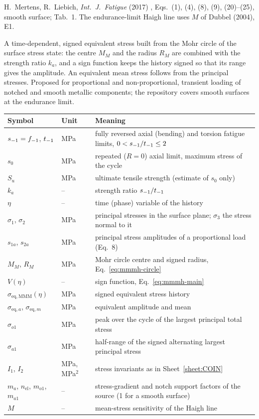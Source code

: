 \label{sheet:MMMH}

 H.~Mertens, R.~Liebich, \emph{Int.\ J.\ Fatigue} (2017) \cite{mertens2017},
Eqs.~(1), (4), (8), (9), (20)--(25), smooth surface; Tab.~1. The endurance-limit Haigh line uses $M$ of
Dubbel (2004), E1.

 A time-dependent, signed equivalent stress built from the Mohr circle of the
surface stress state: the centre $M_M$ and the radius $R_M$ are combined with the strength ratio $k_a$,
and a sign function keeps the history signed so that its range gives the amplitude. An equivalent mean
stress follows from the principal stresses. Proposed for proportional and non-proportional, transient
loading of notched and smooth metallic components; the repository covers smooth surfaces at the
endurance limit.

\begin{center}\small
\begin{tabular}{@{}llp{100mm}@{}}
\toprule
Symbol & Unit & Meaning\\\midrule
$s_{-1}=f_{-1}$, $t_{-1}$ & MPa & fully reversed axial (bending) and torsion fatigue limits, $0<s_{-1}/t_{-1}\le2$\\
$s_0$ & MPa & repeated ($R=0$) axial limit, maximum stress of the cycle\\
$S_u$ & MPa & ultimate tensile strength (estimate of $s_0$ only)\\
$k_a$ & -- & strength ratio $s_{-1}/t_{-1}$\\
$\eta$ & -- & time (phase) variable of the history\\
$\sigma_1$, $\sigma_2$ & MPa & principal stresses in the surface plane; $\sigma_3$ the stress normal to it\\
$s_{1a}$, $s_{2a}$ & MPa & principal stress amplitudes of a proportional load (Eq.~8)\\
$M_M$, $R_M$ & MPa & Mohr circle centre and signed radius, Eq.~\eqref{eq:mmmh-circle}\\
$V(\eta)$ & -- & sign function, Eq.~\eqref{eq:mmmh-main}\\
$\sigma_{\mathrm{eq,MMM}}(\eta)$ & MPa & signed equivalent stress history\\
$\sigma_{\mathrm{eq},a}$, $\sigma_{\mathrm{eq},m}$ & MPa & equivalent amplitude and mean\\
$\sigma_{o1}$ & MPa & peak over the cycle of the largest principal total stress\\
$\sigma_{a1}$ & MPa & half-range of the signed alternating largest principal stress\\
$I_1$, $I_2$ & MPa, MPa$^2$ & stress invariants as in Sheet~\ref{sheet:COIN}\\
$m_a$, $n_{\mathrm{el}}$, $m_{o1}$, $m_{a1}$ & -- & stress-gradient and notch support factors of the source (1 for a smooth surface)\\
$M$ & -- & mean-stress sensitivity of the Haigh line\\
\bottomrule
\end{tabular}
\end{center}

